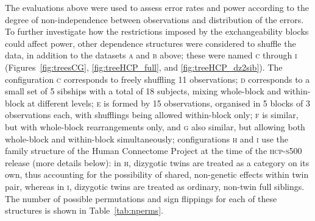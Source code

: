 The evaluations above were used to assess error rates and power according to the degree of non-independence between observations and distribution of the errors. To further investigate how the restrictions imposed by the exchangeability blocks could affect power, other dependence structures were considered to shuffle the data, in addition to the datasets \textsc{a} and \textsc{b} above; these were named \textsc{c} through \textsc{i} (Figures~\ref{fig:treesCG}, \ref{fig:treeHCP_full}, and \ref{fig:treeHCP_dz2sib}). The configuration \textsc{c} corresponds to freely shuffling 11 observations; \textsc{d} corresponds to a small set of 5 sibships with a total of 18 subjects, mixing whole-block and within-block at different levels; \textsc{e} is formed by 15 observations, organised in 5 blocks of 3 observations each, with shufflings being allowed within-block only; \textsc{f} is similar, but with whole-block rearrangements only, and \textsc{g} also similar, but allowing both whole-block and within-block simultaneously; configurations \textsc{h} and \textsc{i} use the family structure of the Human Connectome Project at the time of the \textsc{hcp-s}500 release (more details below): in \textsc{h}, dizygotic twins are treated as a category on its own, thus accounting for the possibility of shared, non-genetic effects within twin pair, whereas in \textsc{i}, dizygotic twins are treated as ordinary, non-twin full siblings. The number of possible permutations and sign flippings for each of these structures is shown in Table~\ref{tab:nperms}.

